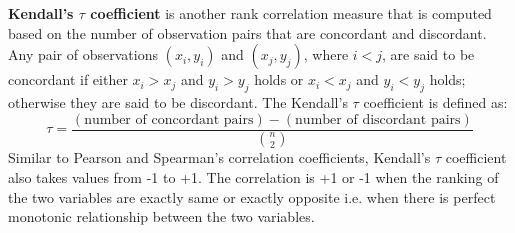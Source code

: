 \noindent \textbf{Kendall's $\tau$ coefficient} is another rank correlation measure that is computed based on the number of observation pairs that are concordant and discordant. Any pair of observations $(x_{i},y_{i})$ and $(x_{j},y_{j})$, where $i<j$, are said to be concordant if either $x_{i}>x_{j}$ and $y_{i}>y_{j}$ holds or $x_{i}<x_{j}$ and $y_{i}<y_{j}$ holds; otherwise they are said to be discordant. The Kendall's $\tau$ coefficient is defined as: 
\begin{equation*}
  \tau ={\frac{(\text{number of concordant pairs})-(\text{number of discordant pairs})}{{n \choose 2}}}
\end{equation*}
Similar to Pearson and Spearman's correlation coefficients, Kendall's $\tau$ coefficient also takes values from -1 to +1. The correlation is +1 or -1 when the ranking of the two variables are exactly same or exactly opposite i.e. when there is perfect monotonic relationship between the two variables. \\
